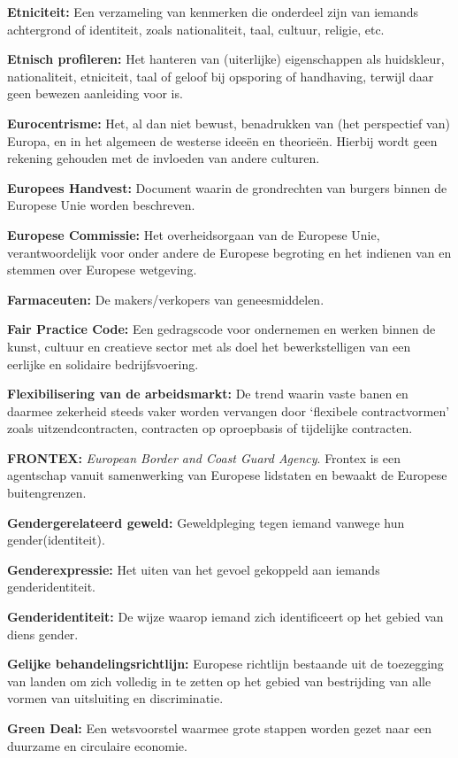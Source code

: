 \textbf{Etniciteit:} Een verzameling van kenmerken die onderdeel zijn
van iemands achtergrond of identiteit, zoals nationaliteit, taal,
cultuur, religie, etc.

\textbf{Etnisch profileren:} Het hanteren van (uiterlijke) eigenschappen
als huidskleur, nationaliteit, etniciteit, taal of geloof bij opsporing
of handhaving, terwijl daar geen bewezen aanleiding voor is.

\textbf{Eurocentrisme:} Het, al dan niet bewust, benadrukken van (het
perspectief van) Europa, en in het algemeen de westerse ideeën en
theorieën. Hierbij wordt geen rekening gehouden met de invloeden van
andere culturen.

\textbf{Europees Handvest:} Document waarin de grondrechten van burgers
binnen de Europese Unie worden beschreven.

\textbf{Europese Commissie:} Het overheidsorgaan van de Europese Unie,
verantwoordelijk voor onder andere de Europese begroting en het indienen
van en stemmen over Europese wetgeving.

\textbf{Farmaceuten:} De makers/verkopers van geneesmiddelen.

\textbf{Fair Practice Code:} Een gedragscode voor ondernemen en werken
binnen de kunst, cultuur en creatieve sector met als doel het
bewerkstelligen van een eerlijke en solidaire bedrijfsvoering.

\textbf{Flexibilisering van de arbeidsmarkt:} De trend waarin vaste
banen en daarmee zekerheid steeds vaker worden vervangen door `flexibele
contractvormen' zoals uitzendcontracten, contracten op oproepbasis of
tijdelijke contracten.

\textbf{FRONTEX:} \emph{European Border and Coast Guard Agency}. Frontex
is een agentschap vanuit samenwerking van Europese lidstaten en bewaakt
de Europese buitengrenzen.

\textbf{Gendergerelateerd geweld:} Geweldpleging tegen iemand vanwege
hun gender(identiteit).

\textbf{Genderexpressie:} Het uiten van het gevoel gekoppeld aan iemands
genderidentiteit.

\textbf{Genderidentiteit:} De wijze waarop iemand zich identificeert op
het gebied van diens gender.

\textbf{Gelijke behandelingsrichtlijn:} Europese richtlijn bestaande uit
de toezegging van landen om zich volledig in te zetten op het gebied van
bestrijding van alle vormen van uitsluiting en discriminatie.

\textbf{Green Deal:} Een wetsvoorstel waarmee grote stappen worden gezet
naar een duurzame en circulaire economie.

